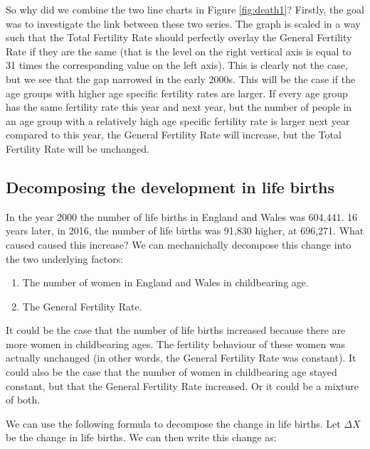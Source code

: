 \documentclass[]{book}
\providecommand{\tightlist}{%
  \setlength{\itemsep}{0pt}\setlength{\parskip}{0pt}}
\begin{document}
So why did we combine the two line charts in Figure \ref{fig:death1}? Firstly, the goal was to investigate the link between these two series. The graph is scaled in a way such that the Total Fertility Rate should perfectly overlay the General Fertility Rate if they are the same (that is the level on the right vertical axis is equal to 31 times the corresponding value on the left axis). This is clearly not the case, but we see that the gap narrowed in the early 2000s. This will be the case if the age groups with higher age specific fertility rates are larger. If every age group has the same fertility rate this year and next year, but the number of people in an age group with a relatively high age specific fertility rate is larger next year compared to this year, the General Fertility Rate will increase, but the Total Fertility Rate will be unchanged.

\hypertarget{decomposing-the-development-in-life-births}{%
\subsection{Decomposing the development in life births}\label{decomposing-the-development-in-life-births}}

In the year 2000 the number of life births in England and Wales was 604,441. 16 years later, in 2016, the number of life births was 91,830 higher, at 696,271. What caused caused this increase? We can mechanichally decompose this change into the two underlying factors:

\begin{enumerate}
\def\labelenumi{\arabic{enumi}.}
\tightlist
\item
  The number of women in England and Wales in childbearing age.
\item
  The General Fertility Rate.
\end{enumerate}

It could be the case that the number of life births increased because there are more women in childbearing ages. The fertility behaviour of these women was actually unchanged (in other words, the General Fertility Rate was constant). It could also be the case that the number of women in childbearing age stayed constant, but that the General Fertility Rate increased. Or it could be a mixture of both.

We can use the following formula to decompose the change in life births. Let \(\Delta X\) be the change in life births. We can then write this change as:
\end{document}

